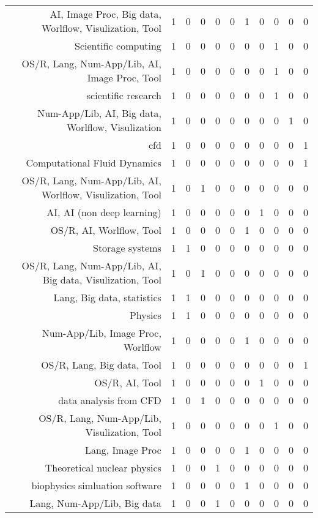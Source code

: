 {\begin{landscape}
\begin{longtable}[htb]{r|c|c|c|c|c|c|c|c|c|c}
{AI, Image Proc, Big data, Worlflow, Visulization, Tool} & 1 & 0 & 0 & 0 & 0 & 1 & 0 & 0 & 0 & 0 \\%
{Scientific computing} & 1 & 0 & 0 & 0 & 0 & 0 & 0 & 1 & 0 & 0 \\%
{OS/R, Lang, Num-App/Lib, AI, Image Proc, Tool} & 1 & 0 & 0 & 0 & 0 & 0 & 0 & 1 & 0 & 0 \\%
{scientific research} & 1 & 0 & 0 & 0 & 0 & 0 & 0 & 1 & 0 & 0 \\%
{Num-App/Lib, AI, Big data, Worlflow, Visulization} & 1 & 0 & 0 & 0 & 0 & 0 & 0 & 0 & 1 & 0 \\%
{cfd} & 1 & 0 & 0 & 0 & 0 & 0 & 0 & 0 & 0 & 1 \\%
{Computational Fluid Dynamics} & 1 & 0 & 0 & 0 & 0 & 0 & 0 & 0 & 0 & 1 \\%
{OS/R, Lang, Num-App/Lib, AI, Worlflow, Visulization, Tool} & 1 & 0 & 1 & 0 & 0 & 0 & 0 & 0 & 0 & 0 \\%
{AI, AI (non deep learning)} & 1 & 0 & 0 & 0 & 0 & 0 & 1 & 0 & 0 & 0 \\%
{OS/R, AI, Worlflow, Tool} & 1 & 0 & 0 & 0 & 0 & 1 & 0 & 0 & 0 & 0 \\%
{Storage systems} & 1 & 1 & 0 & 0 & 0 & 0 & 0 & 0 & 0 & 0 \\%
{OS/R, Lang, Num-App/Lib, AI, Big data, Visulization, Tool} & 1 & 0 & 1 & 0 & 0 & 0 & 0 & 0 & 0 & 0 \\%
{Lang, Big data, statistics} & 1 & 1 & 0 & 0 & 0 & 0 & 0 & 0 & 0 & 0 \\%
{Physics} & 1 & 1 & 0 & 0 & 0 & 0 & 0 & 0 & 0 & 0 \\%
{Num-App/Lib, Image Proc, Worlflow} & 1 & 0 & 0 & 0 & 0 & 1 & 0 & 0 & 0 & 0 \\%
{OS/R, Lang, Big data, Tool} & 1 & 0 & 0 & 0 & 0 & 0 & 0 & 0 & 0 & 1 \\%
{OS/R, AI, Tool} & 1 & 0 & 0 & 0 & 0 & 0 & 1 & 0 & 0 & 0 \\%
{data analysis from CFD} & 1 & 0 & 1 & 0 & 0 & 0 & 0 & 0 & 0 & 0 \\%
{OS/R, Lang, Num-App/Lib, Visulization, Tool} & 1 & 0 & 0 & 0 & 0 & 0 & 0 & 1 & 0 & 0 \\%
{Lang, Image Proc} & 1 & 0 & 0 & 0 & 0 & 1 & 0 & 0 & 0 & 0 \\%
{Theoretical nuclear physics} & 1 & 0 & 0 & 1 & 0 & 0 & 0 & 0 & 0 & 0 \\%
{biophysics simluation software} & 1 & 0 & 0 & 0 & 0 & 1 & 0 & 0 & 0 & 0 \\%
{Lang, Num-App/Lib, Big data} & 1 & 0 & 0 & 1 & 0 & 0 & 0 & 0 & 0 & 0 \\%

\end{longtable}
\end{landscape}}
